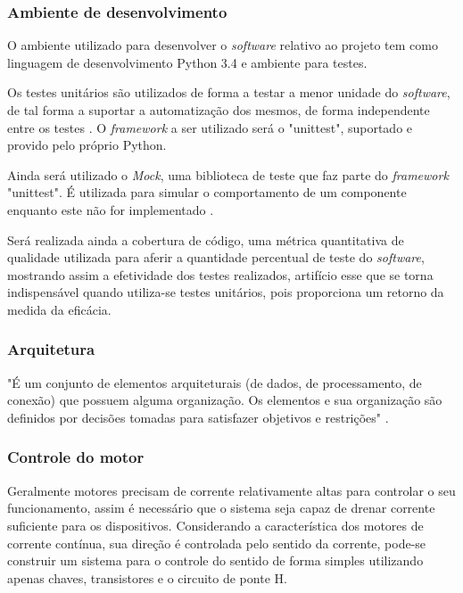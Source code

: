 \subsubsection{Ambiente de desenvolvimento}

O ambiente utilizado para desenvolver o \textit{software} relativo ao projeto tem como linguagem de desenvolvimento Python 3.4 e ambiente para testes.

Os testes unitários são utilizados de forma a testar a menor unidade do \textit{software}, de tal forma a suportar a automatização dos mesmos, de forma independente entre os testes \cite{unittest}. O \textit{framework} a ser utilizado será o "unittest", suportado e provido pelo próprio Python.

Ainda será utilizado o \textit{Mock}, uma biblioteca de teste que faz parte do \textit{framework} "unittest". É utilizada para simular o comportamento de um componente enquanto este não for implementado \cite{unittest_mock}.

Será realizada ainda a cobertura de código, uma métrica quantitativa de qualidade utilizada para aferir a quantidade percentual de teste do \textit{software}, mostrando assim a efetividade dos testes realizados, artifício esse que se torna indispensável quando utiliza-se testes unitários, pois proporciona um retorno da medida da eficácia.

\subsubsection{Arquitetura}

"É um conjunto de elementos arquiteturais (de dados, de processamento, de conexão) que possuem alguma organização. Os elementos e sua organização são definidos por decisões tomadas para satisfazer objetivos e restrições" \cite{arquitetura_definition}.

\subsubsection{Controle do motor}

Geralmente motores precisam de corrente relativamente altas para controlar o seu funcionamento, assim é necessário que o sistema seja capaz de drenar corrente suficiente para os dispositivos. Considerando a característica dos motores de corrente contínua, sua direção é controlada pelo sentido da corrente, pode-se construir um sistema para o controle do sentido de forma simples utilizando apenas chaves, transistores e o circuito de ponte H.

